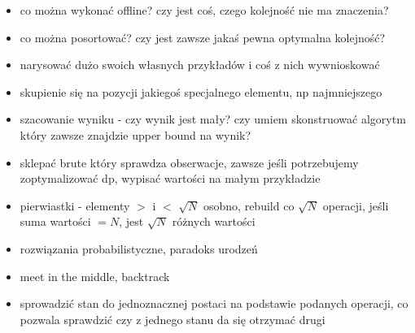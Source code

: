 \begin{itemize}[noitemsep]
	\item co można wykonać offline? czy jest coś, czego kolejność nie ma znaczenia?
	\item co można posortować? czy jest zawsze jakaś pewna optymalna kolejność?
	\item narysować dużo swoich własnych przykładów i coś z nich wywnioskować
	\item skupienie się na pozycji jakiegoś specjalnego elementu, np najmniejszego
	\item szacowanie wyniku - czy wynik jest mały? czy umiem skonstruować algorytm który zawsze znajdzie upper bound na wynik?
	\item sklepać brute który sprawdza obserwacje, zawsze jeśli potrzebujemy zoptymalizować dp, wypisać wartości na małym przykładzie
	\item pierwiastki - elementy $>$ i $<$ $\sqrt{N}$ osobno, rebuild co $\sqrt{N}$ operacji, jeśli suma wartości $=N$, jest $\sqrt{N}$ różnych wartości
	\item rozwiązania probabilistyczne, paradoks urodzeń
	\item meet in the middle, backtrack
	\item sprowadzić stan do jednoznacznej postaci na podstawie podanych operacji, co pozwala sprawdzić czy z jednego stanu da się otrzymać drugi
\end{itemize}
